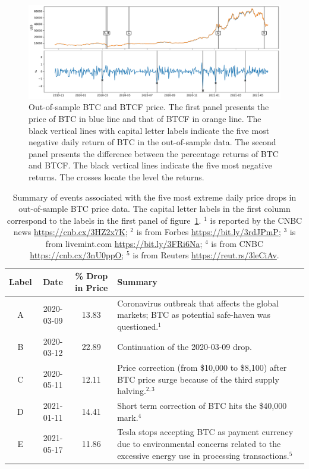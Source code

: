 \begin{figure}[t]
\includegraphics[width=\textwidth]{_pics/BTC_price.pdf}
  \caption{Out-of-sample BTC and BTCF price. The first panel presents the price of BTC in blue line and that of BTCF in orange line.
  The black vertical lines with capital letter labels indicate the five most negative daily return of BTC in the out-of-sample data.
  The second panel presents the difference between the percentage returns of BTC and BTCF.
  The black vertical lines indicate the five most negative returns.
  The crosses locate the level the returns.}
\label{fig:BTC_price}
\end{figure}

\begin{table}[!h]
    \centering
      \begin{tabularx}{.8\textwidth}{cccX}
        \toprule
        Label &   Date & \% Drop in Price &  Summary\\
        \midrule
        A &  2020-03-09 & 13.83 &  Coronavirus outbreak that affects
        the global markets; BTC as potential safe-haven was
        questioned.$^1$\\ 
        B &  2020-03-12 & 22.89 &  Continuation of the 2020-03-09
        drop.  \\ 
        C &  2020-05-11 & 12.11 &  Price correction (from \$10,000 to
        \$8,100) after BTC price surge because of the third supply
        halving.$^{2,3}$ \\ 
        D &  2021-01-11 & 14.41 &  Short term correction of BTC hits
        the \$40,000 mark.$^4$\\ 
        E &  2021-05-17 & 11.86 &  Tesla stops accepting BTC as
        payment currency due to environmental concerns related to the
        excessive energy use in processing transactions.$^5$\\ 
        \bottomrule
      \end{tabularx}
        \caption{Summary of events associated with the five most
          extreme daily price drops in out-of-sample BTC price data. 
        The capital letter labels in the first column correspond to
        the labels in the first panel of figure~\ref{fig:BTC_price}. 
        $^1$ is reported by the CNBC news \url{https://cnb.cx/3HZ2x7K}; $^2$ is from Forbes \url{https://bit.ly/3rdJPmP};
        $^3$ is from livemint.com \url{https://bit.ly/3FRi6Na};
        $^4$ is from CNBC \url{https://cnb.cx/3nU0ppO};
        $^5$ is from Reuters \url{https://reut.rs/3leCiAv}.
        }
        \label{tab:BTC_5min}
  \end{table}

